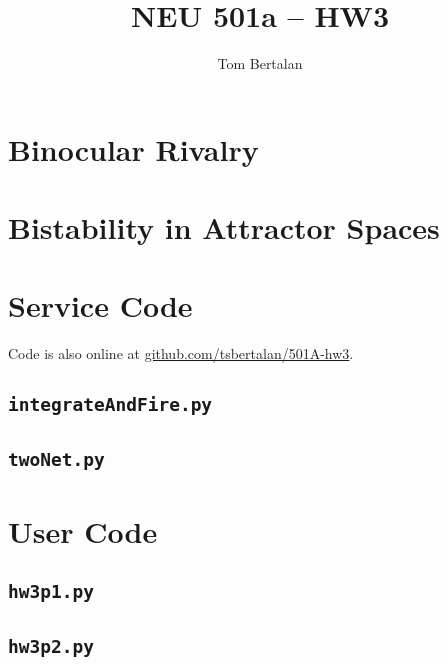 \documentclass[letterpaper,10pt]{article}
\title{NEU 501a -- HW3}
\author{Tom Bertalan}
\newcommand{\code}[1]{
\subsection{\texttt{#1}}
\label{sec:#1}
\texttt{}
}
\begin{document}
\maketitle

\section{Binocular Rivalry}


\newpage
\section{Bistability in Attractor Spaces}


\newpage
\section{Service Code}
\label{sec:serviceCode}
Code is also online at
\href{https://github.com/tsbertalan/501A-hw3}{github.com/tsbertalan/501A-hw3}.

\code{integrateAndFire.py}

\newpage
\code{twoNet.py}

\newpage
\section{User Code}
\label{sec:userCode}

\code{hw3p1.py}

\code{hw3p2.py}
\end{document}
